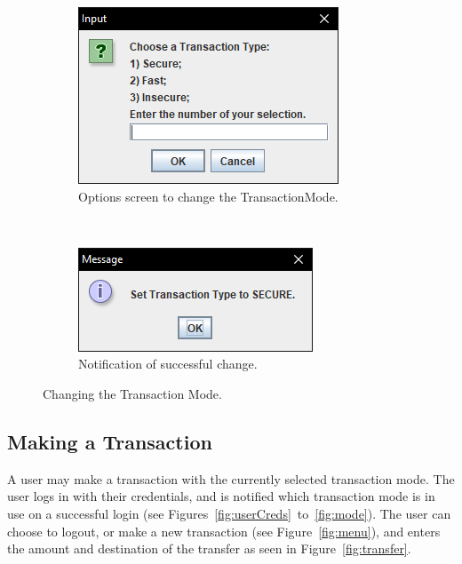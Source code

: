 \documentclass[12pt,twocolumn]{IEEEtran}
\begin{document}
\begin{figure}[h!]
	\centering
	\begin{subfigure}[t]{0.5\textwidth}
		\centering
		\includegraphics[width=0.8\linewidth]{./Resources/chooseMode.PNG}
		\caption{Options screen to change the TransactionMode.}
	\end{subfigure}%
	~ 
	\begin{subfigure}[t]{0.5\textwidth}
		\centering
		\includegraphics[width=0.8\linewidth]{./Resources/changedMode.PNG}
		\caption{Notification of successful change.}
	\end{subfigure}
	\caption{Changing the Transaction Mode.} \label{fig:adminNotification}
\end{figure}

\subsection{Making a Transaction}

A user may make a transaction with the currently selected transaction mode. The user logs in with their credentials, and is notified which transaction mode is in use on a successful login (see Figures~\ref{fig:userCreds}~to~\ref{fig:mode}). The user can choose to logout, or make a new transaction (see Figure~\ref{fig:menu}), and enters the amount and destination of the transfer as seen in Figure~\ref{fig:transfer}.
\end{document}
